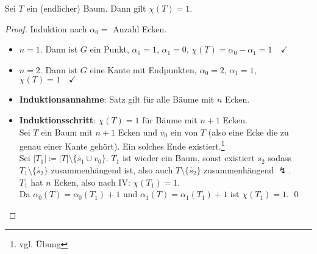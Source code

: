 \begin{theorem}
  Sei $ T $ ein (endlicher) Baum. Dann gilt $ \chi(T) = 1 $.
  \begin{proof}
    Induktion nach $ \alpha_0 = $ Anzahl Ecken.
    \begin{itemize}
      \item $ n = 1 $. Dann ist $ G $ ein Punkt, $ \alpha_0 = 1 $, $ \alpha_1 = 0 $, $ \chi(T) = \alpha_0 - \alpha_1 = 1 \quad \checkmark $ 
      \item $ n = 2 $. Dann ist $ G $ eine Kante mit Endpunkten, $ \alpha_0 = 2 $, $ \alpha_1 = 1 $, $ \chi(T) = 1 \quad \checkmark $
      \item \textbf{Induktionsannahme}: Satz gilt für alle Bäume mit $ n $ Ecken.
      \item \textbf{Induktionsschritt}: $ \chi(T) = 1 $ für Bäume mit $ n+1 $ Ecken. \\
        Sei $ T $ ein Baum mit $ n+1 $ Ecken und $ v_0 $ ein \label{def:blatt} von $ T $ (also eine Ecke die zu genau einer Kante gehört). Ein solches Ende existiert.\footnote{vgl. Übung} \\
        Sei $ \vert T_1 \vert \coloneqq \vert T \vert \setminus \{ \mathring{s_1} \cup v_0 \} $. $ T_1 $ ist wieder ein Baum, sonst existiert $ s_2 $ sodass $ T_1 \setminus \{ \mathring{s_2} \} $ zusammenhängend ist, also auch $ T \setminus \{ \mathring{s_2} \} $ zusammenhängend $ \lightning $. \\
        $ T_1 $ hat $ n $ Ecken, also nach IV: $ \chi(T_1) = 1 $. \\
        Da $ \alpha_0(T) = \alpha_0(T_1) + 1 $ und $ \alpha_1(T) = \alpha_1(T_1) + 1 $ ist $ \chi(T_1) = 1 $. \qed
    \end{itemize}
  \end{proof}
\end{theorem}


